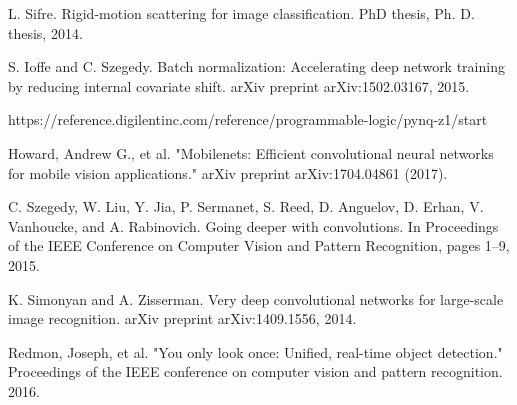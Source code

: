 \documentclass[a4paper, 11pt]{article}
\begin{document}
\begin{thebibliography}{9}


L. Sifre. Rigid-motion scattering for image classification.
PhD thesis, Ph. D. thesis, 2014.

S. Ioffe and C. Szegedy. Batch normalization: Accelerating
deep network training by reducing internal covariate shift.
arXiv preprint arXiv:1502.03167, 2015.

https://reference.digilentinc.com/reference/programmable-logic/pynq-z1/start

Howard, Andrew G., et al. "Mobilenets: Efficient convolutional neural networks for mobile vision applications." arXiv preprint arXiv:1704.04861 (2017).

C. Szegedy, W. Liu, Y. Jia, P. Sermanet, S. Reed,
D. Anguelov, D. Erhan, V. Vanhoucke, and A. Rabinovich.
Going deeper with convolutions. In Proceedings of the IEEE
Conference on Computer Vision and Pattern Recognition,
pages 1–9, 2015.

K. Simonyan and A. Zisserman. Very deep convolutional
networks for large-scale image recognition. arXiv preprint
arXiv:1409.1556, 2014.

Redmon, Joseph, et al. "You only look once: Unified, real-time object detection." Proceedings of the IEEE conference on computer vision and pattern recognition. 2016.


\end{thebibliography}
\end{document}
